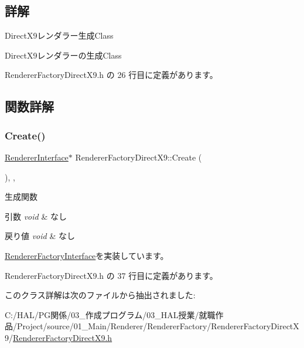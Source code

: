 \subsection{詳解}
Direct\+X9レンダラー生成\+Class 

Direct\+X9レンダラーの生成\+Class 

 Renderer\+Factory\+Direct\+X9.\+h の 26 行目に定義があります。



\subsection{関数詳解}
\mbox{\label{class_renderer_factory_direct_x9_aa64ac54f3efe121f531a28dd3b7690e3}} 
\subsubsection{\texorpdfstring{Create()}{Create()}}
{\footnotesize\ttfamily \mbox{\hyperlink{class_renderer_interface}{Renderer\+Interface}}$\ast$ Renderer\+Factory\+Direct\+X9\+::\+Create (\begin{DoxyParamCaption}{ }\end{DoxyParamCaption})\hspace{0.3cm}{\ttfamily [inline]}, {\ttfamily [override]}, {\ttfamily [virtual]}}



生成関数 


\begin{DoxyParams}{引数}
{\em void} & なし \\
\hline
\end{DoxyParams}

\begin{DoxyRetVals}{戻り値}
{\em void} & なし \\
\hline
\end{DoxyRetVals}


\mbox{\hyperlink{class_renderer_factory_interface_aa81911973b6079fda8489409385d71e3}{Renderer\+Factory\+Interface}}を実装しています。



 Renderer\+Factory\+Direct\+X9.\+h の 37 行目に定義があります。



このクラス詳解は次のファイルから抽出されました\+:\begin{DoxyCompactItemize}
\item 
C\+:/\+H\+A\+L/\+P\+G関係/03\+\_\+作成プログラム/03\+\_\+\+H\+A\+L授業/就職作品/\+Project/source/01\+\_\+\+Main/\+Renderer/\+Renderer\+Factory/\+Renderer\+Factory\+Direct\+X9/\mbox{\hyperlink{_renderer_factory_direct_x9_8h}{Renderer\+Factory\+Direct\+X9.\+h}}\end{DoxyCompactItemize}
